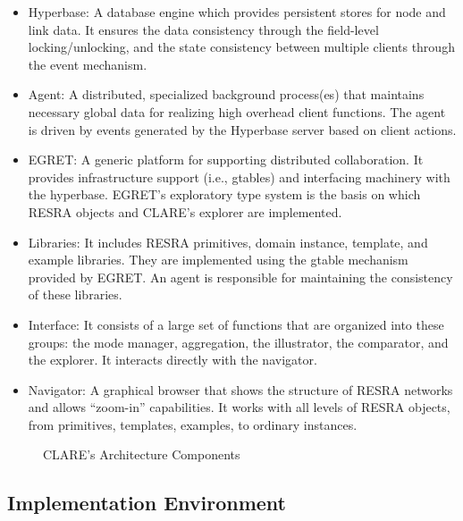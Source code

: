 \begin{itemize}
\item Hyperbase: A database engine which provides persistent stores for
  node and link data. It ensures the data consistency through the
  field-level locking/unlocking, and the state consistency between multiple
  clients through the event mechanism.
  
\item Agent: A distributed, specialized background process(es) that
  maintains necessary global data for realizing high overhead client
  functions. The agent is driven by events generated by the Hyperbase server
  based on client actions.
  
\item EGRET: A generic platform for supporting distributed collaboration.
  It provides infrastructure support (i.e., gtables) and interfacing
  machinery with the hyperbase. EGRET's exploratory type system is the basis
  on which RESRA objects and CLARE's explorer are implemented.
  
\item Libraries: It includes RESRA primitives, domain instance, template,
  and example libraries. They are implemented using the gtable mechanism
  provided by EGRET. An agent is responsible for maintaining the consistency
  of these libraries.
  
\item Interface: It consists of a large set of functions that are organized
  into these groups: the mode manager, aggregation, the illustrator, the
  comparator, and the explorer. It interacts directly with the navigator.
  
\item Navigator: A graphical browser that shows the structure of RESRA
  networks and allows ``zoom-in'' capabilities. It works with all levels of
  RESRA objects, from primitives, templates, examples, to ordinary instances.
\end{itemize}

\begin{figure}[htb]
  \caption{CLARE's Architecture Components}
  \label{fig:arch}
\end{figure}


\subsection{Implementation Environment}
\label{sec:implementation}


